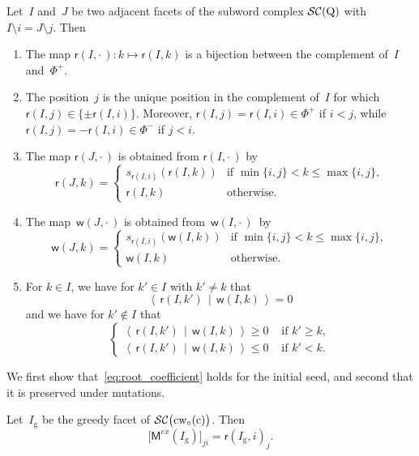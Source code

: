 \documentclass[ALCO,Unicode,ThmDefs]{cedram}
\newcommand{\Mex}{\sfM^{ex}}
\newcommand{\subwordComplex}{\mathcal{SC}}
\newcommand{\clusterComplex}{\subwordComplex\big(\cw{c}\big)}
\newcommand{\greedy}{I_{\operatorname{g}}}
\newcommand{\sq}[1]{{\rm #1}}
\newcommand{\Q}{\sq{Q}}
\newcommand{\sfr}{\mathsf{r}}
\newcommand{\sfw}{\mathsf{w}}
\newcommand{\wo}{{w_\circ}}
\newcommand{\sw}[2]{\sq{#1}(\sq{#2})}
\newcommand{\cwo}[1]{\sw{\wo}{#1}}
\newcommand{\cw}[1]{\sq{#1}\cwo{#1}}
\newcommand{\Root}[2]{{\sfr}(#1,#2)}
\newcommand{\Weight}[2]{{\sfw}(#1,#2)}
\newcommand{\dotprod}[2]{\left\langle \, #1 \,\middle|\, #2 \, \right\rangle}
\newcommand{\sfM}{\mathsf{M}}
\begin{document}
\begin{lemm}\label{lem:lemma33}
Let~$I$ and~$J$ be two adjacent facets of the subword complex $\subwordComplex(\Q)$ with $I\setminus i = J \setminus j$. Then
\begin{enumerate}
\item\label{it:bijectionpositiveroots}
The map $\Root{I}{\cdot\,}: k \mapsto \Root{I}{k}$ is a bijection between the complement of~$I$ and~$\Phi^+$.
\item\label{it:rootflip}
The position~$j$ is the unique position in the complement of~$I$ for which $\Root{I}{j}\in \{\pm \Root{I}{i}\}$. Moreover, $\Root{I}{j}=\Root{I}{i}\in \Phi^+$ if $i<j$, while $\Root{I}{j}=-\Root{I}{i}\in \Phi^-$ if $j<i$.
\item\label{it:rootupdate}
The map $\Root{J}{\cdot\,}$ is obtained from $\Root{I}{\cdot\,}$ by
\[
\Root{J}{k}=\left\{
\begin{array}{cc}s_{\Root{I}{i}}(\Root{I}{k}) & \mbox{if } \min\{i,j\}<k\leq \max\{i,j\}, \\\Root{I}{k} & \mbox{otherwise}.
\end{array}\right.
\]
\item\label{it:weightupdate}
The map~$\Weight{J}{\cdot\,}$ is obtained from~$\Weight{I}{\cdot\,}$~by
\[
\Weight{J}{k} =
\begin{cases} s_{\Root{I}{i}}(\Weight{I}{k}) & \text{if } \min\{i,j\} < k \le \max\{i,j\}, \\ \Weight{I}{k} & \text{otherwise}.
\end{cases}
\]
\item\label{it:weightroot}
For $k \in I$, we have for $k' \in I$ with $k' \neq k$ that
\[
\dotprod{\Root{I}{k'}}{\Weight{I}{k}} = 0
\]
and we have for $k' \notin I$ that
\[
\begin{cases}
\dotprod{\Root{I}{k'}}{\Weight{I}{k}} \geq 0 & \text{ if }k' \ge k, \\
\dotprod{\Root{I}{k'}}{\Weight{I}{k}} \leq 0 & \text{ if }k' < k.
\end{cases}
\]
\end{enumerate}
\end{lemm}

We first show that~\eqref{eq:root_coefficient} holds for the initial seed, and second that it is preserved under mutations.

\begin{prop}\label{prop:extendedpartinitial}
Let~$\greedy$ be the greedy facet of $\clusterComplex$. Then
\[
\big[\Mex(\greedy)\big]_{ji} = \Root{\greedy}{i}_j.
\]
\end{prop}
\end{document}

